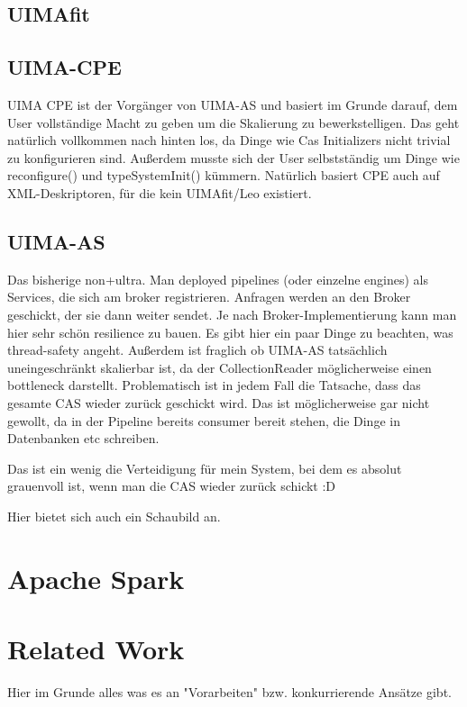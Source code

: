 \subsection{UIMAfit}
\subsection{UIMA-CPE}
UIMA CPE ist der Vorgänger von UIMA-AS und basiert im Grunde darauf, dem User vollständige Macht zu geben um die Skalierung zu bewerkstelligen. Das geht natürlich vollkommen nach hinten los, da Dinge wie Cas Initializers nicht trivial zu konfigurieren sind. Außerdem musste sich der User selbstständig um Dinge wie reconfigure() und typeSystemInit() kümmern. 
Natürlich basiert CPE auch auf XML-Deskriptoren, für die kein UIMAfit/Leo existiert.

\subsection{UIMA-AS}
Das bisherige non+ultra. Man deployed pipelines (oder einzelne engines) als Services, die sich am broker registrieren. Anfragen werden an den Broker geschickt, der sie dann weiter sendet. Je nach Broker-Implementierung kann man hier sehr schön resilience zu bauen. Es gibt hier ein paar Dinge zu beachten, was thread-safety angeht. Außerdem ist fraglich ob UIMA-AS tatsächlich uneingeschränkt skalierbar ist, da der CollectionReader möglicherweise einen bottleneck darstellt. Problematisch ist in jedem Fall die Tatsache, dass das gesamte CAS wieder zurück geschickt wird. Das ist möglicherweise gar nicht gewollt, da in der Pipeline bereits consumer bereit stehen, die Dinge in Datenbanken etc schreiben.

Das ist ein wenig die Verteidigung für mein System, bei dem es absolut grauenvoll ist, wenn man die CAS wieder zurück schickt :D

Hier bietet sich auch ein Schaubild an.

\section{Apache Spark}


\section{Related Work}
Hier im Grunde alles was es an "Vorarbeiten" bzw. konkurrierende Ansätze gibt.

